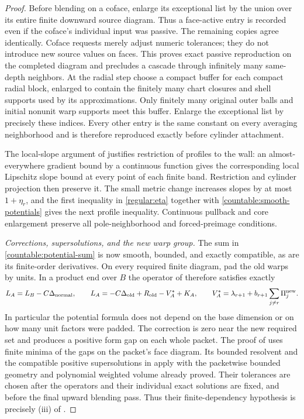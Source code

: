 \begin{proof}
Before blending on a coface, enlarge its exceptional list by the union
over its entire finite downward source diagram. Thus a face-active
entry is recorded even if the coface's individual input was passive.
The remaining copies agree identically. Coface requests merely adjust
numeric tolerances; they do not introduce new source values on faces.
This proves exact passive reproduction on the completed diagram and
precludes a cascade through infinitely many same-depth neighbors.
At the radial step choose a compact buffer for each compact radial
block, enlarged to contain the finitely many chart closures and shell
supports used by its approximations. Only finitely many original
outer balls and initial nonunit warp supports meet this buffer.
Enlarge the exceptional list by precisely these indices. Every other
entry is the same constant on every averaging neighborhood and is
therefore reproduced exactly before cylinder attachment.

The local-slope argument of  justifies restriction
of profiles to the wall: an almost-everywhere gradient bound by a
continuous function gives the corresponding local Lipschitz slope
bound at every point of each finite band. Restriction and cylinder
projection then preserve it. The small metric change increases slopes
by at most $1+\eta_r$, and the first inequality in \eqref{regular:eta}
together with \eqref{countable:smooth-potentials} gives the next profile
inequality.
Continuous pullback and core enlargement preserve all pole-neighborhood
and forced-preimage conditions.

\emph{Corrections, supersolutions, and the new warp group.}
The sum in \eqref{countable:potential-sum} is now smooth, bounded, and
exactly compatible, as are its finite-order derivatives. On every
required finite diagram, pad the old warps by units. In a product end
over $B$ the operator of  therefore satisfies
exactly
\[
 L_A=L_B-C\Delta_{\rm normal},\qquad
 L_A=-C\Delta_{\rm old}+R_{\rm old}-V_A^*+K_A,
 \qquad
 V_A^*=\lambda_{r+1}+b_{r+1}\sum_{j\ne r}\Pi_j^{\rm new}.
\]
In particular the potential formula does not depend on the base
dimension or on how many unit factors were padded. The correction is
zero near the new required set and produces a positive form gap on
each whole packet. The proof of  uses finite
minima of the gaps on the packet's face diagram. Its bounded resolvent
and the compatible positive supersolutions in
 apply with the packetwise
bounded geometry and polynomial weighted volume already proved.
Their tolerances are chosen after the operators and their individual
exact solutions are fixed, and before the final upward blending pass.
Thus their finite-dependency hypothesis is precisely (iii) of
.


\end{proof}
